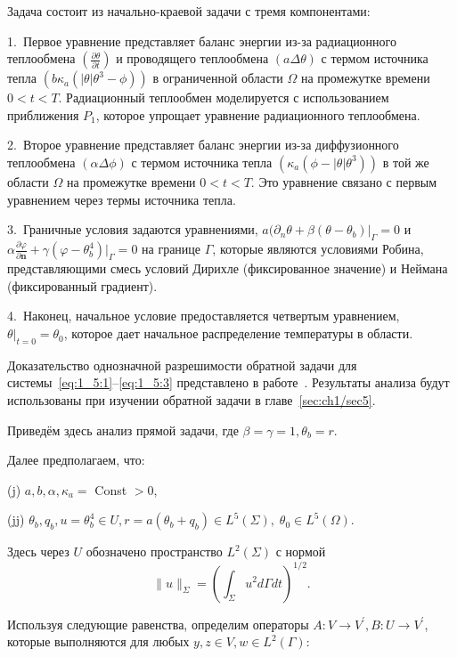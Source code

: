 Задача состоит из начально-краевой задачи с тремя компонентами:


1.\ Первое уравнение представляет баланс энергии из-за радиационного
теплообмена $\left(\frac{\partial \theta}{\partial t}\right)$ и проводящего
теплообмена $(a \Delta \theta)$ с термом источника тепла
$\left(b \kappa_a \left(|\theta| \theta^3 - \phi \right)\right)$
в ограниченной области $\Omega$ на промежутке времени $0 < t < T$.
Радиационный теплообмен моделируется с использованием приближения $P_1$,
которое упрощает уравнение радиационного теплообмена.

2.\ Второе уравнение представляет баланс энергии из-за диффузионного
теплообмена $(\alpha \Delta \phi)$ с термом источника тепла
$\left(\kappa_a \left(\phi - |\theta| \theta^3 \right)\right)$
в той же области $\Omega$ на промежутке времени $0 < t < T$.
Это уравнение связано с первым уравнением через термы источника тепла.

3.\ Граничные условия задаются уравнениями,
$a(\partial_n \theta +\left.\beta\left(\theta-\theta_{b}\right)\right|_{\Gamma}=0$
и $\alpha \frac{\partial \varphi}{\partial \mathbf{n}}
+ \gamma (\varphi-\theta_b^4)|_{\Gamma} = 0$
на границе $\Gamma$, которые являются условиями Робина,
представляющими смесь условий Дирихле
(фиксированное значение) и Неймана (фиксированный градиент).

4.\ Наконец, начальное условие предоставляется четвертым уравнением,
$\theta|_{t=0} = \theta_0$, которое дает начальное
распределение температуры в области.

Доказательство однозначной разрешимости обратной задачи для
системы~\eqref{eq:1_5:1}--\eqref{eq:1_5:3} представлено в работе~\cite{JMAA-19}.
Результаты анализа будут использованы при изучении обратной задачи в главе~\ref{sec:ch1/sec5}.

Приведём здесь анализ прямой задачи, где $\beta=\gamma=1, \theta_b = r$.

Далее предполагаем, что:

(j) $a, b, \alpha, \kappa_{a} =$ Const $>0$,

(jj) $\theta_{b}, q_{b}, u=\theta^4_b \in U, r
=a\left(\theta_{b}+q_{b}\right) \in L^{5}(\Sigma), \; \theta_{0} \in L^{5}(\Omega)$.


Здесь через $U$ обозначено пространство $L^{2}(\Sigma)$ с нормой
\[
    \|u\|_{\Sigma}=\left(\int_{\Sigma} u^{2} d \Gamma d t\right)^{1/2}.
\]

Используя следующие равенства, определим операторы $A: V \rightarrow V^{\prime}, B: U \rightarrow V^{\prime}$,
которые выполняются для любых $y, z \in V, w \in L^{2}(\Gamma)$:

